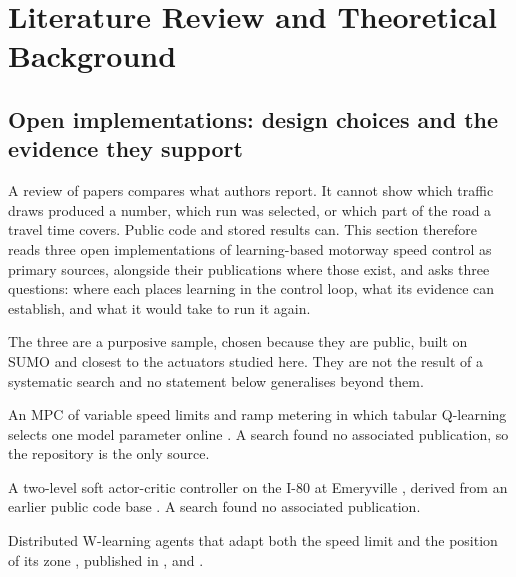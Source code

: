 \chapter{Literature Review and Theoretical Background}\label{ch:literature}




\section[Open implementations]{Open implementations: design choices and the evidence they support}\label{sec:open-impl}

A review of papers compares what authors report. It cannot show which traffic draws produced a number, which run was selected, or which part of the road a travel time covers. Public code and stored results can. This section therefore reads three open implementations of learning-based motorway speed control as primary sources, alongside their publications where those exist, and asks three questions: where each places learning in the control loop, what its evidence can establish, and what it would take to run it again.

The three are a purposive sample, chosen because they are public, built on SUMO and closest to the actuators studied here. They are not the result of a systematic search and no statement below generalises beyond them.

\begin{description}[leftmargin=0pt,style=nextline]
\item[ACMPC] An MPC of variable speed limits and ramp metering in which tabular Q-learning selects one model parameter online \parencite{ACMPCRepo}. A search found no associated publication, so the repository is the only source.
\item[vsl2] A two-level soft actor-critic controller on the I-80 at Emeryville \parencite{Vsl2Repo}, derived from an earlier public code base \parencite{LuSacVsl2022}. A search found no associated publication.
\item[DWL-ST-VSL] Distributed W-learning agents that adapt both the speed limit and the position of its zone \parencite{KusicRepo}, published in \textcite{Kusic2020}, \textcite{Kusic2021ITSC} and \textcite{Kusic2021Math}\verify.
\end{description}

